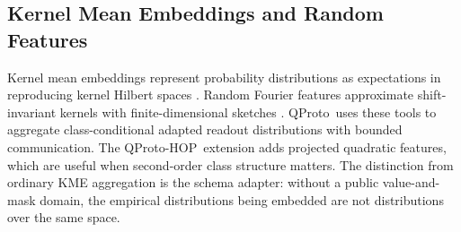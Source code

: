 \documentclass[preprint]{elsarticle}
\newcommand{\method}{QProto}
\newcommand{\hopmethod}{QProto-HOP}
\begin{document}
\subsection{Kernel Mean Embeddings and Random Features}

Kernel mean embeddings represent probability distributions as expectations in reproducing kernel Hilbert spaces \cite{smola2007hilbert,gretton2012mmd}. Random Fourier features approximate shift-invariant kernels with finite-dimensional sketches \cite{rahimi2007random}. \method\ uses these tools to aggregate class-conditional adapted readout distributions with bounded communication. The \hopmethod\ extension adds projected quadratic features, which are useful when second-order class structure matters. The distinction from ordinary KME aggregation is the schema adapter: without a public value-and-mask domain, the empirical distributions being embedded are not distributions over the same space.
\end{document}
